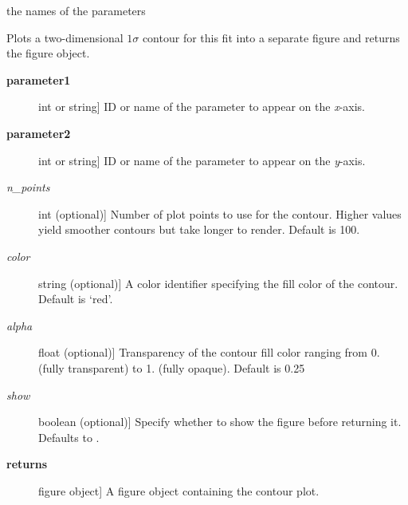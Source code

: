\documentclass[a4paper,10pt,english]{sphinxmanual}
\begin{document}
\begin{fulllineitems}

\begin{fulllineitems}
\label{index:kafe.fit.Fit.parameter_names}
the names of the parameters

\end{fulllineitems}


\begin{fulllineitems}
\label{index:kafe.fit.Fit.plot_contour}
Plots a two-dimensional $1\sigma$ contour for this fit into
a separate figure and returns the figure object.
\begin{description}
\item[{\textbf{parameter1}}] \leavevmode{[}int or string{]}
ID or name of the parameter to appear on the \emph{x}-axis.

\item[{\textbf{parameter2}}] \leavevmode{[}int or string{]}
ID or name of the parameter to appear on the \emph{y}-axis.

\item[{\emph{n\_points}}] \leavevmode{[}int (optional){]}
Number of plot points to use for the contour. Higher
values yield smoother contours but take longer to
render. Default is 100.

\item[{\emph{color}}] \leavevmode{[}string (optional){]}
A  color identifier specifying the fill color
of the contour. Default is `red'.

\item[{\emph{alpha}}] \leavevmode{[}float (optional){]}
Transparency of the contour fill color ranging from 0. (fully
transparent) to 1. (fully opaque). Default is 0.25

\item[{\emph{show}}] \leavevmode{[}boolean (optional){]}
Specify whether to show the figure before returning it. Defaults
to .

\item[{\textbf{returns}}] \leavevmode{[} figure object{]}
A figure object containing the contour plot.

\end{description}


\end{fulllineitems}
\end{fulllineitems}
\end{document}
